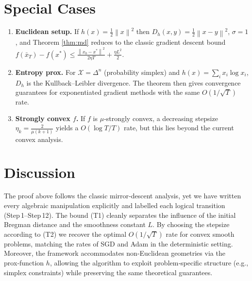 \documentclass{article}
\newcommand{\norm}[1]{\left\lVert #1\right\rVert}
\begin{document}
\section*{Special Cases}
\begin{enumerate}
\item \textbf{Euclidean setup.} If $h(x)=\frac12\norm{x}^{2}$ then $D_h(x,y)=\frac12\norm{x-y}^{2}$, $\sigma=1$, and Theorem \ref{thm:md} reduces to the classic gradient descent bound $f(\bar{x}_T)-f(x^*)\le \frac{\norm{x_0-x^*}^{2}}{2\eta T}+\frac{\eta L^{2}}{2}$.
\item \textbf{Entropy prox.} For $\mathcal{X}=\Delta^{n}$ (probability simplex) and $h(x)=\sum_{i}x_i\log x_i$, $D_h$ is the Kullback–Leibler divergence. The theorem then gives convergence guarantees for exponentiated gradient methods with the same $O(1/\sqrt{T})$ rate.
\item \textbf{Strongly convex $f$.} If $f$ is $\mu$‑strongly convex, a decreasing stepsize $\eta_k=\frac{2}{\mu(k+1)}$ yields a $O(\log T/T)$ rate, but this lies beyond the current convex analysis.
\end{enumerate}

\section*{Discussion}
The proof above follows the classic mirror‑descent analysis, yet we have written every algebraic manipulation explicitly and labelled each logical transition (Step 1–Step 12). The bound (T1) cleanly separates the influence of the initial Bregman distance and the smoothness constant $L$. By choosing the stepsize according to (T2) we recover the optimal $O(1/\sqrt{T})$ rate for convex smooth problems, matching the rates of SGD and Adam in the deterministic setting. Moreover, the framework accommodates non‑Euclidean geometries via the prox‑function $h$, allowing the algorithm to exploit problem‑specific structure (e.g., simplex constraints) while preserving the same theoretical guarantees.
\end{document}
